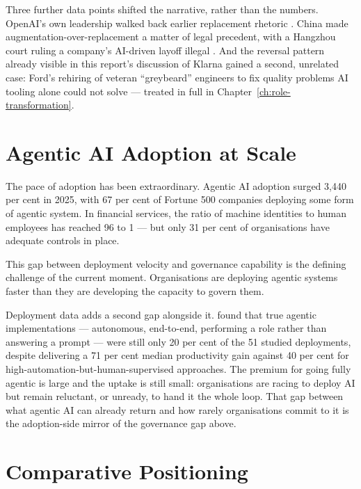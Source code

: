 Three further data points shifted the narrative, rather than the numbers. OpenAI's own leadership walked back earlier replacement rhetoric \parencite{Chatterji2026, AltmanReversal2026}. China made augmentation-over-replacement a matter of legal precedent, with a Hangzhou court ruling a company's AI-driven layoff illegal \parencite{NYTChina2026}. And the reversal pattern already visible in this report's discussion of Klarna gained a second, unrelated case: Ford's rehiring of veteran ``greybeard'' engineers to fix quality problems AI tooling alone could not solve \parencite{Bloomberg2026Ford} --- treated in full in Chapter~\ref{ch:role-transformation}.

\section{Agentic AI Adoption at Scale}

The pace of adoption has been extraordinary. Agentic AI adoption surged 3,440 per cent in 2025, with 67 per cent of Fortune 500 companies deploying some form of agentic system. In financial services, the ratio of machine identities to human employees has reached 96 to 1 \parencite{CyberArk2025} --- but only 31 per cent of organisations have adequate controls in place.

This gap between deployment velocity and governance capability is the defining challenge of the current moment. Organisations are deploying agentic systems faster than they are developing the capacity to govern them.

Deployment data adds a second gap alongside it. \textcite{Pereira2026Playbook} found that true agentic implementations --- autonomous, end-to-end, performing a role rather than answering a prompt --- were still only 20 per cent of the 51 studied deployments, despite delivering a 71 per cent median productivity gain against 40 per cent for high-automation-but-human-supervised approaches. The premium for going fully agentic is large and the uptake is still small: organisations are racing to deploy AI but remain reluctant, or unready, to hand it the whole loop. That gap between what agentic AI can already return and how rarely organisations commit to it is the adoption-side mirror of the governance gap above.

\section{Comparative Positioning}

